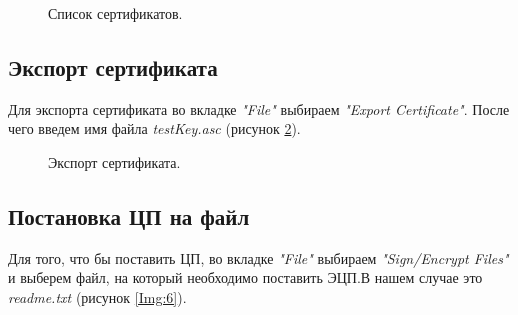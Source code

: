 \documentclass[10pt,a4paper]{report}
\begin{document}
		\begin{figure}[h]
			\caption{Список сертификатов.}
			\label{Img:4}
		\end{figure}
		\pagebreak
		
	\subsection{Экспорт сертификата}
	Для экспорта сертификата во вкладке \textit{"File"} выбираем \textit{"Export Certificate"}. После чего введем имя файла \textit{testKey.asc} (рисунок \ref{Img:5}).
	
		\begin{figure}[h]
			\caption{Экспорт сертификата.}
			\label{Img:5}
		\end{figure}
	
	\subsection{Постановка ЦП на файл}
	Для того, что бы поставить ЦП, во вкладке  \textit{"File"} выбираем \textit{"Sign/Encrypt Files"} и выберем файл, на который необходимо поставить ЭЦП.В нашем случае это \textit{readme.txt} (рисунок \ref{Img:6}).
	
\end{document}

